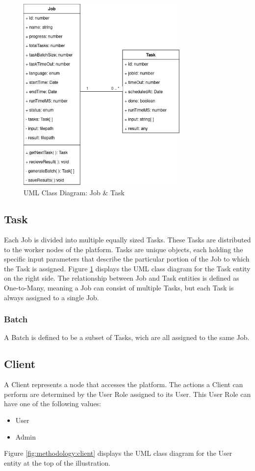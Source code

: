 \begin{figure}[htbp]
  \centering
  \includegraphics[width=0.75\textwidth]{gfx/figures/Job-Task.png}
  \caption{\ac{UML} Class Diagram: Job \& Task}
  \label{fig:methodology:job-task}
\end{figure}

\subsection{Task}
\label{subsec:methodology:entities:task}
Each Job is divided into multiple equally sized Tasks. These Tasks are distributed to the worker nodes of the platform. Tasks are unique objects, each holding the specific input parameters that describe the particular portion of the Job to which the Task is assigned. Figure \ref{fig:methodology:job-task} displays the \ac{UML} class diagram for the Task entity on the right side. The relationship between Job and Task entities is defined as One-to-Many, meaning a Job can consist of multiple Tasks, but each Task is always assigned to a single Job.

\subsubsection{Batch}
\label{ssubsec:methodology:entities:task:batch}
A Batch is defined to be a subset of Tasks, wich are all assigned to the same Job.

\subsection{Client}
\label{subsec:methodology:entities:client}
A Client represents a node that accesses the platform. The actions a Client can perform are determined by the User Role assigned to its User. This User Role can have one of the following values:
\begin{itemize}
  \item User
  \item Admin
\end{itemize}
Figure \ref{fig:methodology:client} displays the \ac{UML} class diagram for the User entity at the top of the illustration.

